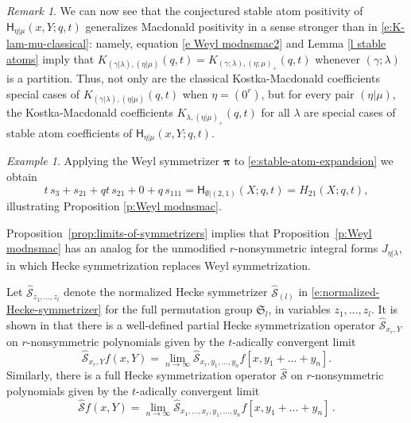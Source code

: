 \documentclass[12pt]{amsart}
\theoremstyle{definition}
\theoremstyle{remark}
\newtheorem{example}[thm]{Example}
\newtheorem{remark}[thm]{Remark}
\newcommand{\pibold}{{\boldsymbol \pi }}
\newcommand{\Weyl}{\pibold }
\newcommand{\Sfrak}{{\mathfrak S}}
\newcommand{\Scal}{{\mathcal S}}
\newcommand{\hsym}{\widehat{\Scal}}    %
\newcommand{\mE}{\mathsf H}   %
\newcommand{\Jns}{J}           %
\begin{document}
\begin{remark}
\label{rem:K-lam-mu-classical}
We can now see that the conjectured stable atom positivity of
$\mE_{\eta|\mu }(x,Y;q,t)$ generalizes Macdonald positivity in a sense
stronger than in \eqref{e:K-lam-mu-classical}: namely, equation
\eqref{e Weyl modnsmac2} and Lemma \ref{l stable atoms} imply that
$K_{(\gamma |\lambda ),(\eta |\mu )}(q,t) = K_{(\gamma;\lambda),(\eta;
\mu )_+}(q,t)$ whenever $(\gamma;\lambda)$ is a partition.  Thus, not
only are the classical Kostka-Macdonald coefficients special cases of
$K_{(\gamma |\lambda ),(\eta |\mu )}(q,t)$ when $\eta =(0^{r})$, but for
every pair $(\eta |\mu )$, the Kostka-Macdonald
coefficients $K_{\lambda ,(\eta |\mu )_{+}}(q,t)$ for all $\lambda $
are special cases of
stable atom coefficients of
$\mE_{\eta|\mu }(x,Y;q,t)$.
\end{remark}


\begin{example}\label{ex:}
Applying the Weyl symmetrizer $\Weyl$ to
\eqref{e:stable-atom-expandsion} we obtain
\begin{equation}
 t \, s_{3} + s_{21} + qt \, s_{21} + 0 + q \, s_{111} =
\mE_{\emptyset|(2,1)}(X;q,t) = H_{21}(X;q,t),
\end{equation}
illustrating Proposition \ref{p:Weyl modnsmac}.
\end{example}


Proposition~\ref{prop:limits-of-symmetrizers} implies that
Proposition~\ref{p:Weyl modnsmac} has an analog for the unmodified
$r$-nonsymmetric integral forms $\Jns _{\eta |\lambda }$, in which
Hecke symmetrization replaces Weyl symmetrization.

Let $\hsym _{z_{1},\ldots,z_{l}}$ denote the normalized Hecke
symmetrizer $\hsym _{(l)}$ in \eqref{e:normalized-Hecke-symmetrizer}
for the full permutation group $\Sfrak _{l}$, in variables
$z_{1},\ldots,z_{l}$.  It is shown in \cite[\S
4.3]{BechtloffWeising23} that there is a well-defined partial Hecke
symmetrization operator $\hsym_{x_r, Y}$ on $r$-nonsymmetric
polynomials given by the $t$-adically convergent limit
\begin{equation}\label{e H sym converge}
\hsym_{x_r,Y} f(x,Y) = \lim_{n \to
\infty} \hsym_{x_r, y_1,\dots,y_n} f[x, y_1+ \dots + y_n].
\end{equation}
Similarly, there is a full Hecke symmetrization operator $\hsym $ on
$r$-nonsymmetric polynomials given by the $t$-adically convergent
limit
\begin{equation}\label{e H sym full}
\hsym f(x,Y) = \lim_{n \to \infty} \hsym_{x_1,\dots, x_r,
y_1,\dots,y_n} f[x, y_1+ \dots + y_n]\, .
\end{equation}
\end{document}
